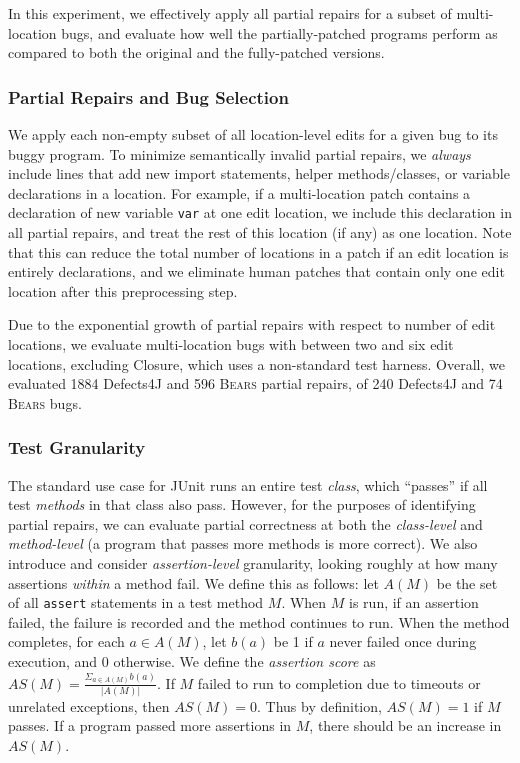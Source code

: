 \documentclass[10pt, conference]{IEEEtran}
\newcommand\bears{\textsc{Bears}\xspace}
\begin{document}
In this experiment, we effectively apply all partial repairs for
a subset of multi-location bugs, and
evaluate how well the partially-patched programs perform 
as compared to both the original and the fully-patched versions. 

\subsubsection{Partial Repairs and Bug Selection}
We apply each non-empty subset of all location-level edits for a given bug to
its buggy program.  To minimize semantically invalid partial repairs, we \emph{always}
include lines that add new import statements, helper methods/classes, or variable declarations
in a location. 
For example, if a multi-location patch contains a declaration of new variable
\texttt{var} at one edit location,
we include this declaration in all partial repairs, and treat the rest of this location (if any) as one location.
Note that this can reduce the total
number of locations in a patch if an edit location is entirely declarations, and we eliminate
human patches that contain only 
one edit location after this preprocessing step. 

Due to the exponential growth of partial repairs with respect to number of edit locations,
we evaluate multi-location bugs with
between two and six edit locations, excluding Closure, which uses a
non-standard test harness. 
Overall, we evaluated 1884 Defects4J and 596 \bears partial repairs,
of 240 Defects4J and 74 \bears bugs.

\subsubsection{Test Granularity}

The standard use case for JUnit runs
an entire test \emph{class}, which ``passes'' if all test \emph{methods} in
that class also pass.  However, for the purposes of identifying partial repairs,
we can evaluate partial correctness at both the \emph{class-level} and
\emph{method-level} (a program that passes more methods is more
correct).
We also introduce and consider \emph{assertion-level} granularity, looking
roughly at how many assertions \emph{within} a method fail.  We define this as follows:
let $A(M)$ be the set of all \texttt{assert}
statements in a test method $M$. 
When $M$ is run, if an assertion failed, the failure is recorded and the method 
continues to run.  When the method completes, for each
$a\in A(M)$, let $b(a)$ be 1 if $a$ never failed once during execution,
and 0 otherwise. We define the \emph{assertion score} as
$AS(M)=\frac{\Sigma_{a\in A(M)}b(a)}{|A(M)|}$. If $M$ failed to run to completion 
due to timeouts or unrelated exceptions, then
$AS(M)=0$. Thus by definition, $AS(M)=1$ if $M$ passes. If a program passed more 
assertions in $M$, there should be an increase in $AS(M)$.
\end{document}
